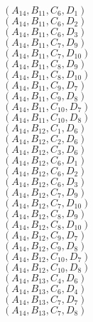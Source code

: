 \documentclass[14pt]{article}
\begin{document}
    $({A}_{14}, {B}_{11}, {C}_{6}, {D}_{1}) $ \\ 
    $({A}_{14}, {B}_{11}, {C}_{6}, {D}_{2}) $ \\ 
    $({A}_{14}, {B}_{11}, {C}_{6}, {D}_{3}) $ \\ 
    $({A}_{14}, {B}_{11}, {C}_{7}, {D}_{9}) $ \\ 
    $({A}_{14}, {B}_{11}, {C}_{7}, {D}_{10}) $ \\ 
    $({A}_{14}, {B}_{11}, {C}_{8}, {D}_{9}) $ \\ 
    $({A}_{14}, {B}_{11}, {C}_{8}, {D}_{10}) $ \\ 
    $({A}_{14}, {B}_{11}, {C}_{9}, {D}_{7}) $ \\ 
    $({A}_{14}, {B}_{11}, {C}_{9}, {D}_{8}) $ \\ 
    $({A}_{14}, {B}_{11}, {C}_{10}, {D}_{7}) $ \\ 
    $({A}_{14}, {B}_{11}, {C}_{10}, {D}_{8}) $ \\ 
    $({A}_{14}, {B}_{12}, {C}_{1}, {D}_{6}) $ \\ 
    $({A}_{14}, {B}_{12}, {C}_{2}, {D}_{6}) $ \\ 
    $({A}_{14}, {B}_{12}, {C}_{3}, {D}_{6}) $ \\ 
    $({A}_{14}, {B}_{12}, {C}_{6}, {D}_{1}) $ \\ 
    $({A}_{14}, {B}_{12}, {C}_{6}, {D}_{2}) $ \\ 
    $({A}_{14}, {B}_{12}, {C}_{6}, {D}_{3}) $ \\ 
    $({A}_{14}, {B}_{12}, {C}_{7}, {D}_{9}) $ \\ 
    $({A}_{14}, {B}_{12}, {C}_{7}, {D}_{10}) $ \\ 
    $({A}_{14}, {B}_{12}, {C}_{8}, {D}_{9}) $ \\ 
    $({A}_{14}, {B}_{12}, {C}_{8}, {D}_{10}) $ \\ 
    $({A}_{14}, {B}_{12}, {C}_{9}, {D}_{7}) $ \\ 
    $({A}_{14}, {B}_{12}, {C}_{9}, {D}_{8}) $ \\ 
    $({A}_{14}, {B}_{12}, {C}_{10}, {D}_{7}) $ \\ 
    $({A}_{14}, {B}_{12}, {C}_{10}, {D}_{8}) $ \\ 
    $({A}_{14}, {B}_{13}, {C}_{4}, {D}_{6}) $ \\ 
    $({A}_{14}, {B}_{13}, {C}_{6}, {D}_{4}) $ \\ 
    $({A}_{14}, {B}_{13}, {C}_{7}, {D}_{7}) $ \\ 
    $({A}_{14}, {B}_{13}, {C}_{7}, {D}_{8}) $ \\ 
\end{document}
